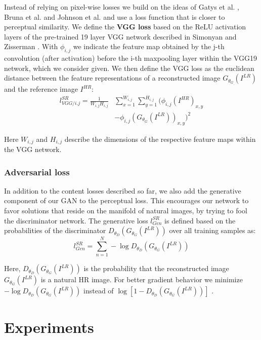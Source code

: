 \documentclass[10pt,twocolumn,letterpaper]{article}
\begin{document}
Instead of relying on pixel-wise losses we build on the ideas of Gatys et al. \cite{Gatys2015nips}, Bruna et al. \cite{bruna2016super} and Johnson et al. \cite{Johnson16PercepLoss} and use a loss function that is closer to perceptual similarity. We define the \textbf{VGG loss} based on the ReLU activation layers of the pre-trained 19 layer VGG network described in Simonyan and Zisserman \cite{simonyan2014very}. With $\phi_{i,j}$ we indicate the feature map obtained by the j-th convolution (after activation) before the i-th maxpooling layer within the VGG19 network, which we consider given.
	We then define the VGG loss as the euclidean distance between the feature representations of a reconstructed image $G_{\theta_G}(I^{LR})$ and the reference image $I^{HR}$:
	\begin{equation}
	\begin{split}
	l^{SR}_{VGG/i.j} =
	\frac{1}{W_{i,j}H_{i,j}} & \sum_{x=1}^{W_{i,j}} \sum_{y=1}^{H_{i,j}} (\phi_{i,j}(I^{HR})_{x,y} \\
	& - \phi_{i,j}(G_{\theta_G}(I^{LR}))_{x,y})^2	
	\end{split}
	\label{eq:vgg}
	\end{equation}

Here $W_{i,j}$ and $H_{i,j}$ describe the dimensions of the respective feature maps within the VGG network.

\subsubsection{Adversarial loss}
In addition to the content losses described so far, we also add the generative component of our \ac{GAN} to the perceptual loss. This encourages our network to favor solutions that reside on the manifold of natural images, by trying to fool the discriminator network. The generative loss $l^{SR}_{Gen}$ is defined based on the probabilities of the discriminator $D_{\theta_D}(G_{\theta_G}(I^{LR}))$ over all training samples as:
\begin{equation}
	l^{SR}_{Gen} = \sum_{n=1}^{N} -\log D_{\theta_D}(G_{\theta_G}(I^{LR}))
\end{equation}

Here, $D_{\theta_D}(G_{\theta_G}(I^{LR}))$ is the probability that the
reconstructed image $G_{\theta_G}(I^{LR})$ is a natural HR image. For better gradient behavior we minimize $-\log D_{\theta_D}(G_{\theta_G}(I^{LR}))$ instead of $\log [1-D_{\theta_D}(G_{\theta_G}(I^{LR}))]$ \cite{Goodfellow14GAN}.

%
\section{Experiments}
\label{sec:experiments}
\end{document}
